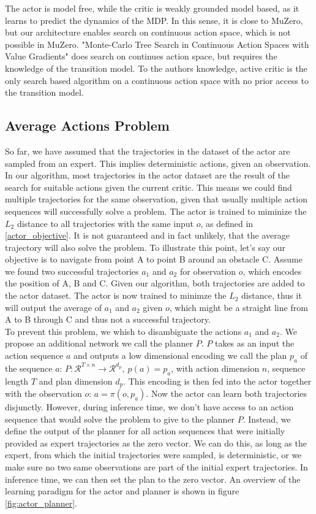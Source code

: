 The actor is model free, while the critic is weakly grounded model based, as it learns to predict the dynamics of the MDP. In this sense, it is close to MuZero, 
but our architecture enables search on continuous action space, which is not possible in MuZero. 
"Monte-Carlo Tree Search in Continuous Action Spaces with Value Gradients" does search on continues action space, but requires the knowledge of the transition model. 
To the authors knowledge, active critic is the only search based algorithm on a continuous action space with no prior access to the transition model.

\subsection{Average Actions Problem}
\label{avr_action_problem}
So far, we have assumed that the trajectories in the dataset of the actor are sampled from an expert. This implies deterministic actions, given an observation. 
In our algorithm, most trajectories in the actor dataset are the result of the search for suitable actions given the current critic. This means we could find
multiple trajectories for the same observation, given that usually multiple action sequences will successfully solve a problem. The actor is trained to miminize 
the $L_2$ distance to all trajectories with the same input $o$, as defined in \ref{actor_objective}. It is not guaranteed and in fact unlikely, that the 
average trajectory will also solve the problem. To illustrate this point, let's say our objective 
is to navigate from point A to point B around an obstacle C. Assume we found two successful trajectories 
$a_1$ and $a_2$ for observation $o$, which encodes the position of A, B and C. Given our algorithm, both trajectories are added to the actor dataset. 
The actor is now trained to minimze the $L_2$ distance, thus it will output the average of $a_1$ and $a_2$ given $o$, which might be a straight line from A to B 
through C and thus not a successful trajectory. \\
To prevent this problem, we whish to disambiguate the actions $a_1$ and $a_2$. We propose an additional network we call the planner $P$. $P$ takes as an input 
the action sequence $a$ and outputs a low dimensional encoding we call the plan $p_a$ of the sequence $a$: 
$P:\mathcal{R}^{T\times n} \rightarrow \mathcal{R}^{d_p},\ p(a) = p_a$, with action dimension $n$, sequence length $T$ and plan dimension $d_p$. This encoding is then fed into the actor together 
with the observation $o$: $a = \pi(o, p_a)$. Now the actor can learn both trajectories disjunctly. However, during inference time, we don't have access to an action sequence 
that would solve the problem to give to the planner $P$. Instead, we define the output of the planner for all action sequences that were initially provided as 
expert trajectories as the zero vector. We can do this, as long as the expert, from which the initial trajectories were sampled, is deterministic, or we make sure 
no two same observations are part of the initial expert trajectories. In inference time, we can then set the plan to the zero vector. An overview of the learning 
paradigm for the actor and planner is shown in figure \ref{fig:actor_planner}.

